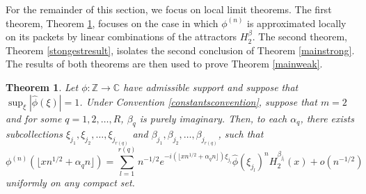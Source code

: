 \documentclass{article}
\theoremstyle{theorem}
\newtheorem{theorem}{Theorem}[section]
\theoremstyle{remark}
\begin{document}
\noindent For the remainder of this section, we focus on local limit theorems. The first theorem, Theorem \ref{weakresult22}, focuses on the case in which $\phi^{(n)}$ is approximated locally on its packets by linear combinations of the attractors $H_2^{\beta}$. The second theorem, Theorem \ref{stongestresult}, isolates the second conclusion of Theorem \ref{mainstrong}. The results of both theorems are then used to prove Theorem \ref{mainweak}. 

\begin{theorem}\label{weakresult22}
Let $\phi:\mathbb{Z}\rightarrow\mathbb{C}$ have admissible support and suppose that $\sup_{\xi}|\hat{\phi}(\xi)|=1$. Under Convention \ref{constantsconvention}, suppose that $m=2$ and for some $q=1,2,\dots,R$, $\beta_q$ is purely imaginary. Then, to each $\alpha_q$, there exists subcollections $\xi_{j_1},\xi_{j_2},\dots,\xi_{j_{r(q)}}$ and $\beta_{j_1},\beta_{j_2},\dots,\beta_{j_{r(q)}}$, such that 
\begin{equation}\label{convolpower22}
\phi^{(n)}(\lfloor xn^{1/2}+\alpha_q n\rfloor)=\sum_{l=1}^{r(q)}n^{-1/2}e^{-i(\lfloor xn^{1/2}+\alpha_q
n\rfloor) \xi_{j_l}}\hat{\phi}(\xi_{j_l})^n H_2^{\beta_{j_l}}(x)+o(n^{-1/2})
\end{equation}  
uniformly on any compact set. 
\end{theorem}
\end{document}
